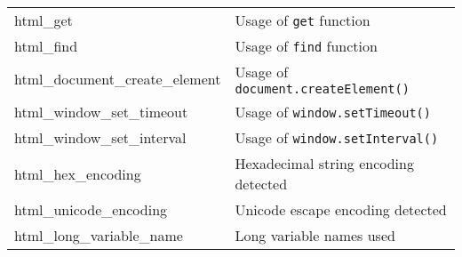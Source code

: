 \begin{longtable}{@{}ll@{}}
html\_get & Usage of \texttt{get} function \\
html\_find & Usage of \texttt{find} function \\
html\_document\_create\_element & Usage of \texttt{document.createElement()} \\
html\_window\_set\_timeout & Usage of \texttt{window.setTimeout()} \\
html\_window\_set\_interval & Usage of \texttt{window.setInterval()} \\
html\_hex\_encoding & Hexadecimal string encoding detected \\
html\_unicode\_encoding & Unicode escape encoding detected \\
html\_long\_variable\_name & Long variable names used \\

\end{longtable}


